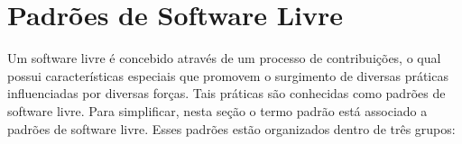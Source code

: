 
\section{Padrões de Software Livre}

Um software livre é concebido através de um processo de contribuições, o qual possui características especiais que promovem o surgimento de diversas práticas influenciadas por diversas forças. Tais práticas são conhecidas como padrões de software livre. Para simplificar, nesta seção o termo padrão está associado a padrões de software livre. Esses padrões estão organizados dentro de três grupos:


